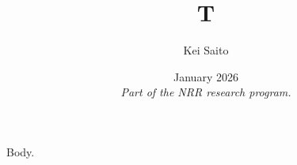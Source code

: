 \documentclass{article}
\begin{document}
\title{T}
\author{Kei Saito}
\date{January 2026\\[5pt] \textit{Part of the NRR research program.}}
\maketitle
Body.
\end{document}
